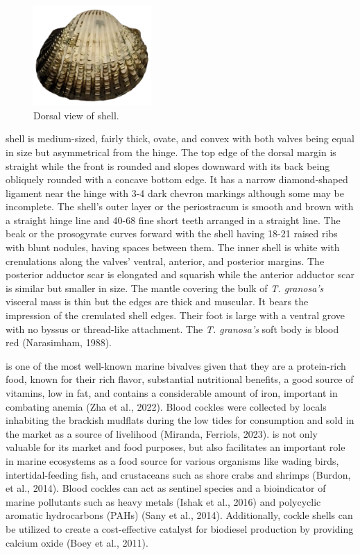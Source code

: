 \begin{figure}[!htbp]
	\centering
	\includegraphics[width=0.4\textwidth]{figures/figure1.png}
	\caption{Dorsal view of \Tegillarcagranosa shell.}
\end{figure}

\textit{\Tgranosa} shell is medium-sized, fairly thick, ovate, and convex with both valves being equal in size but asymmetrical from the hinge. The top edge of the dorsal margin is straight while the front is rounded and slopes downward with its back being obliquely rounded with a concave bottom edge. It has a narrow diamond-shaped ligament near the hinge with 3-4 dark chevron markings although some may be incomplete. The shell’s outer layer or the periostracum is smooth and brown with a straight hinge line and 40-68 fine short teeth arranged in a straight line. The beak or the prosogyrate curves forward with the shell having 18-21 raised ribs with blunt nodules, having spaces between them. The inner shell is white with crenulations along the valves' ventral, anterior, and posterior margins. The posterior adductor scar is elongated and squarish while the anterior adductor scar is similar but smaller in size. The mantle covering the bulk of \textit{T. granosa’s} visceral mass is thin but the edges are thick and muscular. It bears the impression of the crenulated shell edges. Their foot is large with a ventral grove with no byssus or thread-like attachment. The  \textit{T. granosa’s} soft body is blood red (Narasimham, 1988).  

\Tgranosa is one of the most well-known marine bivalves given that they are a protein-rich food, known for their rich flavor, substantial nutritional benefits, a good source of vitamins, low in fat, and contains a considerable amount of iron, important in combating anemia (Zha et al., 2022). Blood cockles were collected by locals inhabiting the brackish mudflats during the low tides for consumption and sold in the market as a source of livelihood (Miranda, Ferriols, 2023). \Tgranosa is not only valuable for its market and food purposes, but also facilitates an important role in marine ecosystems as a food source for various organisms like wading birds, intertidal-feeding fish, and crustaceans such as shore crabs and shrimps (Burdon, et al., 2014). Blood cockles can act as sentinel species and a bioindicator of marine pollutants such as heavy metals (Ishak et al., 2016) and polycyclic aromatic hydrocarbons (PAHs) (Sany et al., 2014). Additionally, cockle shells can be utilized to create a cost-effective catalyst for biodiesel production by providing calcium oxide (Boey et al., 2011).

